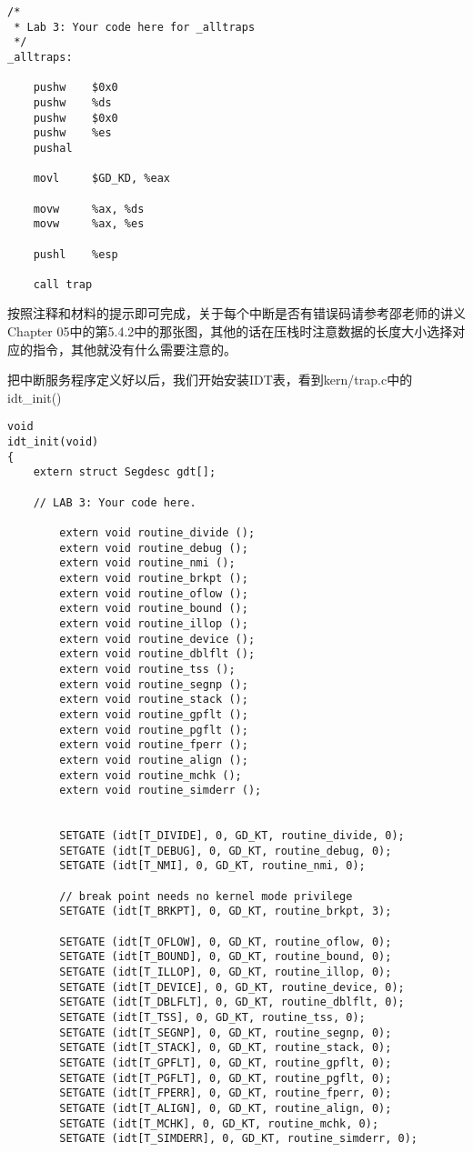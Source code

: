 \documentclass{article}
\newcommand{\funcname}[1]{{\ttfamily \small #1}}
\begin{document}
\begin{CJK*}{UTF8}{gkai}
\begin{lstlisting}[style=acode, title={\scriptsize \ttfamily \bfseries kern/trapentry.S}]
/*
 * Lab 3: Your code here for _alltraps
 */
_alltraps:

    pushw    $0x0
    pushw    %ds
    pushw    $0x0
    pushw    %es
    pushal

    movl     $GD_KD, %eax
    
    movw     %ax, %ds
    movw     %ax, %es

    pushl    %esp

    call trap
\end{lstlisting}

按照注释和材料的提示即可完成，关于每个中断是否有错误码请参考邵老师的讲义Chapter 05中的第5.4.2中的那张图，其他的话在压栈时注意数据的长度大小选择对应的指令，其他就没有什么需要注意的。

把中断服务程序定义好以后，我们开始安装IDT表，看到kern/trap.c中的\funcname{idt\_init()}

\begin{lstlisting}[style=ccode, title={\scriptsize \ttfamily \bfseries kern/trap.c: idt\_init()}]
void
idt_init(void)
{
	extern struct Segdesc gdt[];
	
	// LAB 3: Your code here.

        extern void routine_divide ();
        extern void routine_debug ();
        extern void routine_nmi ();
        extern void routine_brkpt ();
        extern void routine_oflow ();
        extern void routine_bound ();
        extern void routine_illop ();
        extern void routine_device ();
        extern void routine_dblflt ();
        extern void routine_tss ();
        extern void routine_segnp ();
        extern void routine_stack ();
        extern void routine_gpflt ();
        extern void routine_pgflt ();
        extern void routine_fperr ();
        extern void routine_align ();
        extern void routine_mchk ();
        extern void routine_simderr ();


        SETGATE (idt[T_DIVIDE], 0, GD_KT, routine_divide, 0);
        SETGATE (idt[T_DEBUG], 0, GD_KT, routine_debug, 0);
        SETGATE (idt[T_NMI], 0, GD_KT, routine_nmi, 0);

        // break point needs no kernel mode privilege
        SETGATE (idt[T_BRKPT], 0, GD_KT, routine_brkpt, 3);

        SETGATE (idt[T_OFLOW], 0, GD_KT, routine_oflow, 0);
        SETGATE (idt[T_BOUND], 0, GD_KT, routine_bound, 0);
        SETGATE (idt[T_ILLOP], 0, GD_KT, routine_illop, 0);
        SETGATE (idt[T_DEVICE], 0, GD_KT, routine_device, 0);
        SETGATE (idt[T_DBLFLT], 0, GD_KT, routine_dblflt, 0);
        SETGATE (idt[T_TSS], 0, GD_KT, routine_tss, 0);
        SETGATE (idt[T_SEGNP], 0, GD_KT, routine_segnp, 0);
        SETGATE (idt[T_STACK], 0, GD_KT, routine_stack, 0);
        SETGATE (idt[T_GPFLT], 0, GD_KT, routine_gpflt, 0);
        SETGATE (idt[T_PGFLT], 0, GD_KT, routine_pgflt, 0);
        SETGATE (idt[T_FPERR], 0, GD_KT, routine_fperr, 0);
        SETGATE (idt[T_ALIGN], 0, GD_KT, routine_align, 0);
        SETGATE (idt[T_MCHK], 0, GD_KT, routine_mchk, 0);
        SETGATE (idt[T_SIMDERR], 0, GD_KT, routine_simderr, 0);


\end{lstlisting}
\end{CJK*}
\end{document}
